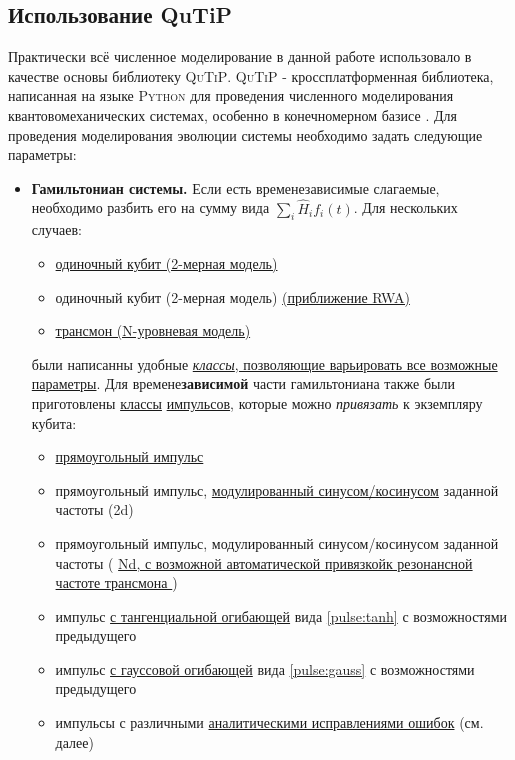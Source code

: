 \documentclass[12pt, twoside]{report}
\numberwithin{equation}{section}
\numberwithin{figure}{section}
\begin{document}
\subsection{Использование QuTiP} \label{subsec:qutip}
Практически всё численное моделирование в данной работе использовало в качестве основы библиотеку \textsc{QuTiP}. \textsc{QuTiP} - кроссплатформенная библиотека, написанная на языке \textsc{Python} для проведения численного моделирования квантовомеханических системах, особенно в конечномерном базисе \cite{johansson2012qutip, Johansson2013} . Для проведения моделирования эволюции системы необходимо задать следующие параметры: 
\begin{itemize}
	\item \textbf{Гамильтониан системы.} Если есть временезависимые слагаемые, необходимо разбить его на сумму вида $\sum_i \hat{H}_i f_i(t)$. Для нескольких случаев:
	\begin{itemize}
		\item \underline{одиночный кубит (2-мерная модель)}
		\item одиночный кубит (2-мерная модель) \underline{(приближение RWA)}
		\item \underline{трансмон (N-уровневая модель)}
	\end{itemize}	 были написанны удобные \underline{\textit{классы}, позволяющие варьировать все возможные} \newline \underline{параметры}. Для времене\textbf{зависимой} части гамильтониана также были приготовлены \underline{классы} \underline{импульсов}, которые можно \textit{привязать} к экземпляру кубита:
	\begin{itemize}
		\item \underline{прямоугольный импульс}
		\item прямоугольный импульс, \underline{модулированный синусом/косинусом} \newline заданной частоты (2d)
		\item прямоугольный импульс, модулированный синусом/косинусом заданной частоты ( \underline{Nd, с возможной автоматической привязкой}\newline \underline{к резонансной частоте трансмона })
		\item импульс \underline{с тангенциальной огибающей} вида \ref{pulse:tanh} с возможностями предыдущего
		\item импульс \underline{с гауссовой огибающей} вида \ref{pulse:gauss} с возможностями предыдущего
		\item импульсы с различными \underline{аналитическими исправлениями ошибок} (см. далее)

\end{itemize}
\end{itemize}
\end{document}
